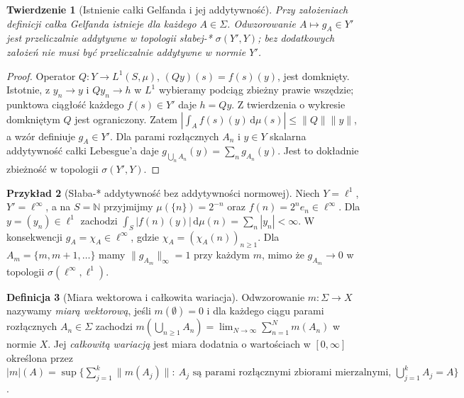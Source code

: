 \documentclass[11pt,a4paper]{article}
\numberwithin{equation}{section}
\theoremstyle{plain}
\newtheorem{twierdzenie}{Twierdzenie}[section]
\theoremstyle{definition}
\newtheorem{definicja}[twierdzenie]{Definicja}
\newtheorem{przyklad}[twierdzenie]{Przykład}
\theoremstyle{remark}
\newcommand{\N}{\mathbb N}
\begin{document}
\begin{twierdzenie}[Istnienie całki Gelfanda i jej addytywność]
\label{thm:gelfand-exists15b}
Przy założeniach definicji całka Gelfanda istnieje dla
każdego $A\in\Sigma$. Odwzorowanie
$A\mapsto g_A\in Y'$ jest przeliczalnie addytywne
w topologii słabej-* $\sigma(Y',Y)$; bez dodatkowych
założeń nie musi być przeliczalnie addytywne w normie $Y'$.
\end{twierdzenie}
\begin{proof}
Operator $Q:Y\to L^1(S,\mu)$, $(Qy)(s)=f(s)(y)$,
jest domknięty. Istotnie, z $y_n\to y$ i $Qy_n\to h$
w $L^1$ wybieramy podciąg zbieżny prawie wszędzie;
punktowa ciągłość każdego $f(s)\in Y'$ daje $h=Qy$.
Z twierdzenia o wykresie domkniętym $Q$ jest ograniczony.
Zatem $|\int_Af(s)(y)\,\mathrm d\mu(s)|\le\|Q\|\|y\|$,
a wzór definiuje $g_A\in Y'$.
Dla parami rozłącznych $A_n$ i $y\in Y$ skalarna
addytywność całki Lebesgue'a daje
$g_{\bigcup_nA_n}(y)=\sum_ng_{A_n}(y)$.
Jest to dokładnie zbieżność w topologii $\sigma(Y',Y)$.
\end{proof}

\begin{przyklad}[Słaba-* addytywność bez addytywności normowej]
\label{ex:gelfand-weakstar15b}
Niech $Y=\ell^1$, $Y'=\ell^\infty$, a na $S=\N$ przyjmijmy
$\mu(\{n\})=2^{-n}$ oraz $f(n)=2^ne_n\in\ell^\infty$.
Dla $y=(y_n)\in\ell^1$ zachodzi
$\int_S|f(n)(y)|\,\mathrm d\mu(n)=\sum_n|y_n|<\infty$.
W konsekwencji $g_A=\chi_A\in\ell^\infty$, gdzie
$\chi_A=(\chi_A(n))_{n\ge1}$. Dla $A_m=\{m,m+1,\ldots\}$
mamy $\|g_{A_m}\|_\infty=1$ przy każdym $m$, mimo że
$g_{A_m}\to0$ w topologii $\sigma(\ell^\infty,\ell^1)$.
\end{przyklad}

\begin{definicja}[Miara wektorowa i całkowita wariacja]
\label{def:vector-measure15b}
Odwzorowanie $m:\Sigma\to X$ nazywamy \emph{miarą wektorową},
jeśli $m(\emptyset)=0$ i dla każdego ciągu parami rozłącznych
$A_n\in\Sigma$ zachodzi
$m(\bigcup_{n\ge1}A_n)=\lim_{N\to\infty}\sum_{n=1}^Nm(A_n)$
w normie $X$. Jej \emph{całkowitą wariacją} jest miara
dodatnia o wartościach w $[0,\infty]$ określona przez
$|m|(A)=\sup\{\sum_{j=1}^k\|m(A_j)\|:\ A_j\text{ są
parami rozłącznymi zbiorami mierzalnymi, }
\bigcup_{j=1}^kA_j=A\}$.
\end{definicja}
\end{document}
